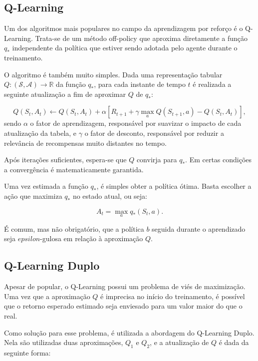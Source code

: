 \subsection{Q-Learning}
\label{subsec:q-theory}
Um dos algoritmos mais populares no campo da aprendizagem por reforço é o Q-Learning. Trata-se de um método off-policy que aproxima diretamente a função $q_*$ independente da política que estiver sendo adotada pelo agente durante o treinamento.

O algoritmo é também muito simples. Dada uma representação tabular $Q: (\mathcal{S},\mathcal{A}) \to \mathbb{R}$ da função $q_*$, para cada instante de tempo $t$ é realizada a seguinte atualização a fim de aproximar $Q$ de $q_*$:

\begin{equation}
Q(S_t, A_t) \leftarrow Q(S_t, A_t) + \alpha[R_{t+1} + \gamma\max_{a} Q(S_{t+1}, a) - Q(S_t, A_t)],
\end{equation}
% 
sendo $\alpha$ o fator de aprendizagem, responsável por suavizar o impacto de cada atualização da tabela, e $\gamma$ o fator de desconto, responsável por reduzir a relevância de recompensas muito distantes no tempo.

Após iterações suficientes, espera-se que $Q$ convirja para $q_*$. Em certas condições a convergência é matematicamente garantida.

Uma vez estimada a função $q_*$, é simples obter a política ótima. Basta escolher a ação que maximiza $q_*$ no estado atual, ou seja:

\begin{equation}
A_{t} = \max_{a} q_*(S_t, a).
\end{equation}

É comum, mas não obrigatório, que a política $b$ seguida durante o aprendizado seja $epsilon$-gulosa em relação à aproximação $Q$.

\subsection{Q-Learning Duplo}
\label{subsec:dq-theory}
Apesar de popular, o Q-Learning possui um problema de viés de maximização. Uma vez que a aproximação $Q$ é imprecisa no início do treinamento, é possível que o retorno esperado estimado seja enviesado para um valor maior do que o real.

Como solução para esse problema, é utilizada a abordagem do Q-Learning Duplo. Nela são utilizadas duas aproximações, $Q_1$ e $Q_2$, e a atualização de $Q$ é dada da seguinte forma:

